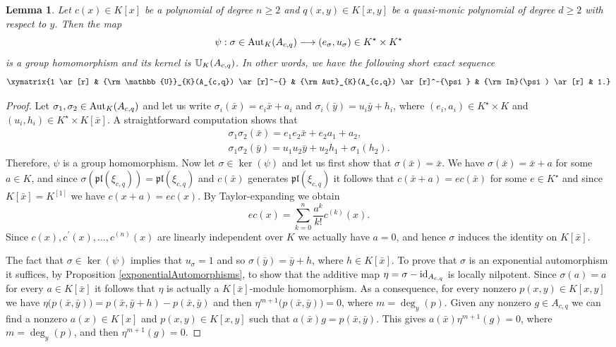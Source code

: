 \documentclass{article}
\newcommand \pl {\mathfrak{pl}}
\renewcommand \a {A}
\renewcommand \k {K}
\newcommand \saut {{\rm \mathbb{U}}}
\newcommand \auto {{\rm Aut}}
\newcommand \image {{\rm Im}}
\newtheorem{lemma}[theorem]{Lemma}
\begin{document}
{\begin{lemma}\label{canonicalHomomorphism}Let $c(x)\in\k[x]$ be a polynomial of degree $n\geq 2$ and $q(x,y)\in\k[x,y]$ be a quasi-monic polynomial of degree $d\geq 2$ with respect to $y$. Then the map $$\psi:\sigma\in \auto_{\k}(\a_{c,q})\longrightarrow (e_{\sigma},u_{\sigma})\in \k^{\star}\times\k^{\star}$$ is a group homomorphism and its kernel is $\saut_{\k}(\a_{c,q})$. In other words, we have the following short exact sequence $$\xymatrix{1 \ar[r] & \saut_{\k}(\a_{c,q}) \ar[r]^-{} & \auto_{\k}(\a_{c,q}) \ar[r]^-{\psi} & \image(\psi) \ar[r] & 1.}$$ 
\end{lemma}
\begin{proof}Let $\sigma_1,\sigma_2\in\auto_{\k}(\a_{c,q})$ and let us write $\sigma_i(\bar{x})=e_i\bar{x}+a_i$ and $\sigma_i(\bar{y})=u_i\bar{y}+h_i$, where $(e_i,a_i)\in\k^{\star}\times \k$ and $(u_i,h_i)\in\k^{\star}\times \k[\bar{x}]$. A straightforward computation shows that
	$$\begin{array}{ll}
		\sigma_1\sigma_2(\bar{x})=e_1e_2\bar{x}+e_2a_1+a_2, \\\sigma_1\sigma_2(\bar{y})=u_1u_2\bar{y}+u_2h_1+\sigma_1(h_2).
	\end{array}$$
	Therefore, $\psi$ is a group homomorphism. Now let $\sigma\in \ker(\psi)$ and let us first show that $\sigma(\bar{x})=\bar{x}$. We have $\sigma(\bar{x})=\bar{x}+a$ for some $a\in\k$, and since $\sigma(\pl(\xi_{c,q}))=\pl(\xi_{c,q})$ and $c(\bar{x})$ generates $\pl(\xi_{c,q})$ it follows that $c(\bar{x}+a)=ec(\bar{x})$ for some $e\in\k^{\star}$ and since $\k[\bar{x}]=\k^{[1]}$ we have $c(x+a)=ec(x)$. By Taylor-expanding we obtain $$ec(x)=\sum_{k=0}^{n}\frac{a^k}{k!}c^{(k)}(x).$$ Since $c(x),c^{\prime}(x),\ldots,c^{(n)}(x)$ are linearly independent over $\k$ we actually have $a=0$, and hence $\sigma$ induces the identity on $\k[\bar{x}]$.
	
	\smallskip The fact that $\sigma\in \ker(\psi)$ implies that $u_{\sigma}=1$ and so $\sigma(\bar{y})=\bar{y}+h$, where $h\in\k[\bar{x}]$. To prove that $\sigma$ is an exponential automorphism it suffices, by Proposition \ref{exponentialAutomorphisms}, to show that the additive map $\eta=\sigma-{\rm id}_{\a_{c,q}}$ is locally nilpotent. Since $\sigma(a)=a$ for every $a\in\k[\bar{x}]$ it follows that $\eta$ is actually a $\k[\bar{x}]$-module homomorphism. As a consequence, for every nonzero $p(x,y)\in\k[x,y]$ we have $\eta\big(p(\bar{x},\bar{y})\big)=p(\bar{x},\bar{y}+h)-p(\bar{x},\bar{y})$ and then $\eta^{m+1}\big(p(\bar{x},\bar{y})\big)=0$, where $m=\deg_y(p)$. Given any nonzero $g\in\a_{c,q}$ we can find a nonzero $a(x)\in\k[x]$ and $p(x,y)\in\k[x,y]$ such that $a(\bar{x})g=p(\bar{x},\bar{y})$. This gives $a(\bar{x})\eta^{m+1}(g)=0$, where $m=\deg_y(p)$, and then $\eta^{m+1}(g)=0$.
\end{proof} 

}
\end{document}
